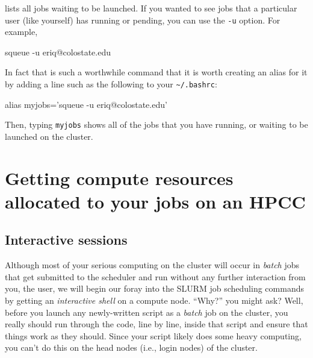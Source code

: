 \documentclass[]{krantz}
\makeatletter
\newenvironment{Shaded}{\begin{snugshade}}{\end{snugshade}}
\newcommand{\BuiltInTok}[1]{#1}
\newcommand{\ExtensionTok}[1]{#1}
\newcommand{\NormalTok}[1]{#1}
\newcommand{\StringTok}[1]{\textcolor[rgb]{0.5,0.5,0.5}{#1}}
\newenvironment{kframe}{%
\medskip{}
\setlength{\fboxsep}{.8em}
 \def\at@end@of@kframe{}%
 \ifinner\ifhmode%
  \def\at@end@of@kframe{\end{minipage}}%
  \begin{minipage}{\columnwidth}%
 \fi\fi%
 \def\FrameCommand##1{\hskip\@totalleftmargin \hskip-\fboxsep
 \colorbox{shadecolor}{##1}\hskip-\fboxsep
     \hskip-\linewidth \hskip-\@totalleftmargin \hskip\columnwidth}%
 \MakeFramed {\advance\hsize-\width
   \@totalleftmargin\z@ \linewidth\hsize
   \@setminipage}}%
 {\par\unskip\endMakeFramed%
 \at@end@of@kframe}
\renewenvironment{Shaded}{\begin{kframe}}{\end{kframe}}
\makeatother
\begin{document}
lists all jobs waiting to be launched. If you wanted to see jobs that a particular
user (like yourself) has running or pending, you can use the \texttt{-u} option. For example,

\begin{Shaded}
\begin{Highlighting}[]
\ExtensionTok{squeue}\NormalTok{ -u eriq@colostate.edu}
\end{Highlighting}
\end{Shaded}

In fact that is such a worthwhile command that it is worth creating an alias
for it by adding a line such as the following to your \texttt{\textasciitilde{}/.bashrc}:

\begin{Shaded}
\begin{Highlighting}[]
\BuiltInTok{alias}\NormalTok{ myjobs=}\StringTok{'squeue -u eriq@colostate.edu'}
\end{Highlighting}
\end{Shaded}

Then, typing \texttt{myjobs} shows all of the jobs that you have running, or waiting to be launched
on the cluster.

\hypertarget{getting-compute-resources-allocated-to-your-jobs-on-an-hpcc}{%
\section{Getting compute resources allocated to your jobs on an HPCC}\label{getting-compute-resources-allocated-to-your-jobs-on-an-hpcc}}

\hypertarget{interactive-sessions}{%
\subsection{Interactive sessions}\label{interactive-sessions}}

Although most of your serious computing on the cluster will occur in \emph{batch} jobs
that get submitted to the scheduler and run without any further interaction from you, the user,
we will begin our foray into the SLURM job scheduling commands by getting an \emph{interactive shell}
on a compute node. ``Why?'' you might ask? Well, before you launch any newly-written
script as a \emph{batch} job
on the cluster, you really should run through the code, line by line, inside that script and ensure that
things work as they should. Since your script likely does some heavy computing, you can't do this on the
head nodes (i.e., login nodes) of the cluster.
\end{document}
